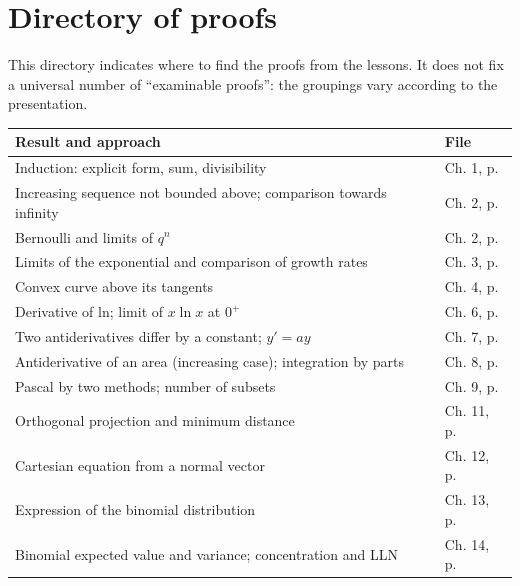 \chapter{Directory of proofs}
This directory indicates where to find the proofs from the lessons. It does not fix a universal number of ``examinable proofs'': the groupings vary according to the presentation.
\begin{longtable}{@{}p{}p{}@{}}\toprule\textbf{Result and approach}&\textbf{File}\\\midrule\endhead
Induction: explicit form, sum, divisibility&Ch. 1, p. \pageref{ch:1}\\
Increasing sequence not bounded above; comparison towards infinity&Ch. 2, p. \pageref{ch:2}\\
Bernoulli and limits of $q^n$&Ch. 2, p. \pageref{ch:2}\\
Limits of the exponential and comparison of growth rates&Ch. 3, p. \pageref{ch:3}\\
Convex curve above its tangents&Ch. 4, p. \pageref{ch:4}\\
Derivative of ln; limit of $x\ln x$ at $0^+$&Ch. 6, p. \pageref{ch:6}\\
Two antiderivatives differ by a constant; $y'=ay$&Ch. 7, p. \pageref{ch:7}\\
Antiderivative of an area (increasing case); integration by parts&Ch. 8, p. \pageref{ch:8}\\
Pascal by two methods; number of subsets&Ch. 9, p. \pageref{ch:9}\\
Orthogonal projection and minimum distance&Ch. 11, p. \pageref{ch:11}\\
Cartesian equation from a normal vector&Ch. 12, p. \pageref{ch:12}\\
Expression of the binomial distribution&Ch. 13, p. \pageref{ch:13}\\
Binomial expected value and variance; concentration and LLN&Ch. 14, p. \pageref{ch:14}\\\bottomrule\end{longtable}
